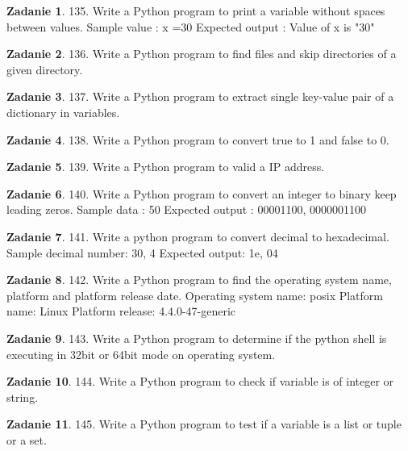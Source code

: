 \documentclass[11pt]{article}
\theoremstyle{definition}
\newtheorem{zadanie}{Zadanie}
\begin{document}
\begin{zadanie}
135. Write a Python program to print a variable without spaces between values.
Sample value : x =30
Expected output : Value of x is "30"
\end{zadanie}

\begin{zadanie}
136. Write a Python program to find files and skip directories of a given directory.
\end{zadanie}

\begin{zadanie}
137. Write a Python program to extract single key-value pair of a dictionary in variables.
\end{zadanie}

\begin{zadanie}
138. Write a Python program to convert true to 1 and false to 0.
\end{zadanie}

\begin{zadanie}
139. Write a Python program to valid a IP address.
\end{zadanie}

\begin{zadanie}
140. Write a Python program to convert an integer to binary keep leading zeros.
Sample data : 50
Expected output : 00001100, 0000001100
\end{zadanie}

\begin{zadanie}
141. Write a python program to convert decimal to hexadecimal.
Sample decimal number: 30, 4
Expected output: 1e, 04
\end{zadanie}

\begin{zadanie}
142. Write a Python program to find the operating system name, platform and platform release date.
Operating system name:
posix
Platform name:
Linux
Platform release:
4.4.0-47-generic
\end{zadanie}

\begin{zadanie}
143. Write a Python program to determine if the python shell is executing in 32bit or 64bit mode on operating system.
\end{zadanie}

\begin{zadanie}
144. Write a Python program to check if variable is of integer or string.
\end{zadanie}

\begin{zadanie}
145. Write a Python program to test if a variable is a list or tuple or a set.
\end{zadanie}
\end{document}
